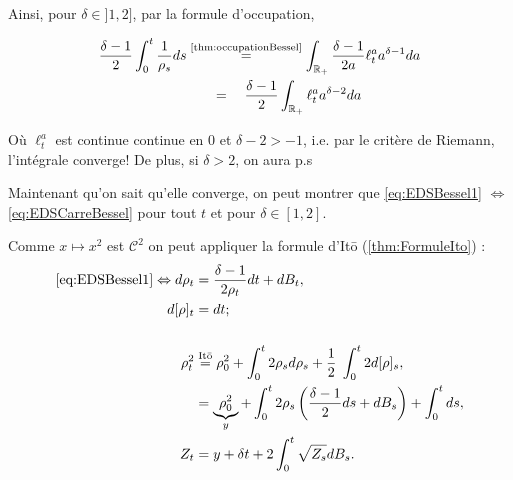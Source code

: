 \documentclass[openany]{book}
\newcommand{\R}{\mathbb{R}}
\newcommand{\1}{\mathbbm{1}}
\theoremstyle{thmfont}
\theoremstyle{deffont}
\theoremstyle{thmfont}
\theoremstyle{deffont}
\begin{document}
Ainsi, pour $\delta \in ]1,2]$, par la formule d'occupation, 

\begin{align*}
  \dfrac{\delta-1}{2}\int_0^t \dfrac{1}{\rho_s} ds &\overset{\text{\autoref{thm:occupationBessel}}}{=} \int_{\R_+} \dfrac{\delta-1}{2 a} \ell_t^a a^{\delta-1} da\\
  &\quad\;\;\;=\quad \dfrac{\delta-1}{2} \int_{\R_+} \ell_t^a a^{\delta-2} da
\end{align*}

Où $\ell_t^a$ est continue continue en $0$ et $\delta-2 >-1$, i.e. par le critère de Riemann, l'intégrale converge! De plus, si $\delta > 2$, on aura p.s

Maintenant qu'on sait qu'elle converge, on peut montrer que \eqref{eq:EDSBessel1} $\Leftrightarrow$ \eqref{eq:EDSCarreBessel} pour tout $t$ et pour $\delta \in [1,2]$.

  Comme $x \mapsto x^2$ est $\mathcal C^2$ on peut appliquer la formule d'Itō (\autoref{thm:FormuleIto}) :
\begin{alignat*}{1}
  \eqref{eq:EDSBessel1} \Leftrightarrow d\rho_t
  &= \dfrac{\delta -1}{2\rho_t}dt + dB_t,\\
  d[\rho]_t &= dt;\\\\
  \rho_t^2 &\overset{\text{Itō}}{=} \rho_0^2 + \int_0^t 2\rho_s d\rho_s + \dfrac{1}{2}\;\int_0^t2 d[\rho]_s,\\
  &= \underbrace{\rho_0^2}_y + \int_0^t2 \rho_s \left(\dfrac{\delta -1}{2}ds + dB_s\right) +\int_0^t ds,\\
  Z_t &= y + \delta t + 2\int_0^t \sqrt{Z_s} dB_s.
\end{alignat*}
\end{document}
